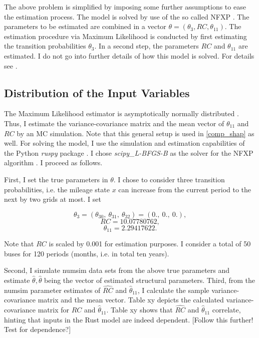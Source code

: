 The above problem is simplified by imposing some further assumptions to ease the estimation process. The model is solved by use of the so called NFXP \citep{R87}. The parameters to be estimated are combined in a vector $\theta=(\theta_3, RC, \theta_{11}) $. The estimation procedure via Maximum Likelihood is conducted by first estimating the transition probabilities $\theta_3$. In a second step, the parameters $RC$ and $\theta_{11}$ are estimated. I do not go into further details of how this model is solved. For details see \citet{R87}.

\subsection{Distribution of the Input Variables}

The Maximum Likelihood estimator is asymptotically normally distributed \citep{R73}. Thus, I estimate the variance-covariance matrix and the mean vector of $\theta_{11}$ and $RC$ by an MC simulation. Note that this general setup is used in \cref{comp_shap} as well. For solving the model, I use the simulation and estimation capabilities of the Python \textit{ruspy} package \citep{OSE19}. I chose \textit{scipy\_L-BFGS-B} as the solver for the NFXP algorithm \citep{SP20}. I proceed as follows.

First, I set the true parameters in $\theta$. I chose to consider three transition probabilities, i.e. the mileage state $x$ can increase from the current period to the next by two grids at most. I set

$$\theta_3 = (\theta_{30},\ \theta_{31},\ \theta_{32})=(0.,\ 0.,\ 0.),$$
$$RC = 10.07780762,$$
$$\theta_{11} = 2.29417622.$$

\noindent Note that $RC$ is scaled by 0.001 for estimation purposes. I consider a total of 50 buses for 120 periods (months, i.e. in total ten years).

Second, I simulate numsim data sets from the above true parameters and estimate $\hat{\theta}, \hat{\theta}$ being the vector of estimated structural parameters.
Third, from the numsim parameter estimates of $\widehat{RC}$ and ${\hat{\theta}}_{11}$, I calculate the sample variance-covariance matrix and the mean vector. Table xy depicts the calculated variance-covariance matrix for $\widehat{RC}$ and ${\hat{\theta}}_{11}$. Table xy shows that $\widehat{RC}$ and ${\hat{\theta}}_{11}$ correlate, hinting that inputs in the Rust model are indeed dependent.
[Follow this further! Test for dependence?]

